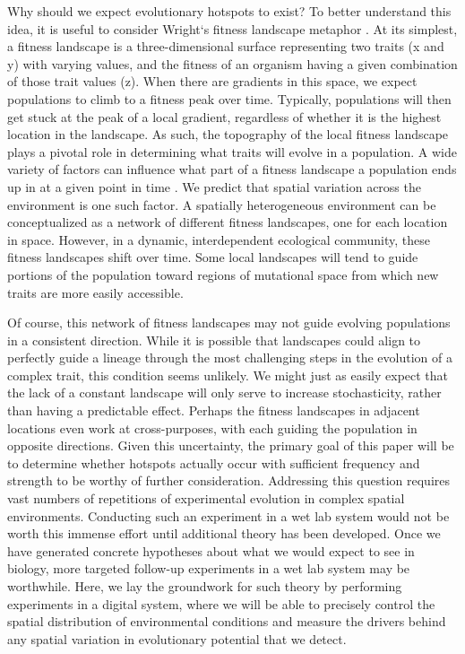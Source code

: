 \documentclass[letterpaper]{article}
\begin{document}
Why should we expect evolutionary hotspots to exist? To better understand this idea, it is useful to consider Wright`s fitness landscape metaphor \citep{wright_roles_1932}. At its simplest, a fitness landscape is a three-dimensional surface representing two traits (x and y) with varying values, and the fitness of an organism having a given combination of those trait values (z). When there are gradients in this space, we expect populations to climb to a fitness peak over time. Typically, populations will then get stuck at the peak of a local gradient, regardless of whether it is the highest location in the landscape. As such, the topography of the local fitness landscape plays a pivotal role in determining what traits will evolve in a population. A wide variety of factors can influence what part of a fitness landscape a population ends up in at a given point in time \citep{wilke_evolution_2001}. We predict that spatial variation across the environment is one such factor. A spatially heterogeneous environment can be conceptualized as a network of different fitness landscapes, one for each location in space. However, in a dynamic, interdependent ecological community, these fitness landscapes shift over time. Some local landscapes will tend to guide portions of the population toward regions of mutational space from which new traits are more easily accessible.

Of course, this network of fitness landscapes may not guide evolving populations in a consistent direction. While it is possible that landscapes could align to perfectly guide a lineage through the most challenging steps in the evolution of a complex trait, this condition seems unlikely. We might just as easily expect that the lack of a constant landscape will only serve to increase stochasticity, rather than having a predictable effect. Perhaps the fitness landscapes in adjacent locations even work at cross-purposes, with each guiding the population in opposite directions. Given this uncertainty, the primary goal of this paper will be to determine whether hotspots actually occur with sufficient frequency and strength to be worthy of further consideration. Addressing this question requires vast numbers of repetitions of experimental evolution in complex spatial environments. Conducting such an experiment in a wet lab system would not be worth this immense effort until additional theory has been developed. Once we have generated concrete hypotheses about what we would expect to see in biology, more targeted follow-up experiments in a wet lab system may be worthwhile. Here, we lay the groundwork for such theory by performing experiments in a digital system, where we will be able to precisely control the spatial distribution of environmental conditions and measure the drivers behind any spatial variation in evolutionary potential that we detect.
\end{document}

